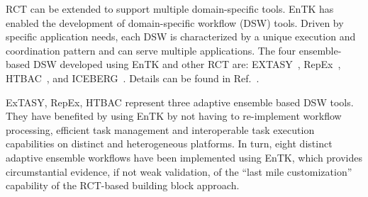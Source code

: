 RCT can be extended to support multiple domain-specific tools. EnTK has
enabled the development of domain-specific workflow (DSW) tools. Driven by
specific application needs, each DSW is characterized by a unique execution
and coordination pattern and can serve multiple applications. The four
ensemble-based DSW developed using EnTK and other RCT are:
EXTASY~\cite{balasubramanian2016extasy}, RepEx~\cite{treikalis2016repex},
HTBAC~\cite{dakka2018high}, and ICEBERG~\cite{web-iceberg}. Details can be
found in Ref.~\cite{turilli2019middleware}.

ExTASY, RepEx, HTBAC represent three adaptive ensemble based DSW tools. They
have benefited by using EnTK by not having to re-implement workflow
processing, efficient task management and interoperable task execution
capabilities on distinct and heterogeneous platforms. In turn, eight distinct
adaptive ensemble workflows have been implemented using EnTK, which provides
circumstantial evidence, if not weak validation, of the ``last mile
customization'' capability of the RCT-based building block approach.








